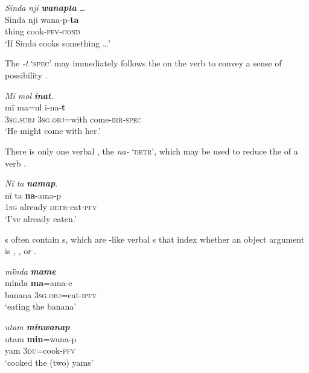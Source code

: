 \ea%
    \label{ex:overview:27}
    \textit{Sinda nji} \textbf{\textit{wanapta}} \textit{…}\\
\gll    Sinda  nji    wana-p-\textbf{ta}\\
    [name]  thing  cook-\textsc{pfv-cond}\\
\glt    ‘If Sinda cooks something …\textsc{’}
\z

The   \textit{{}-t} ‘\textsc{spec’} may immediately follows the   on the verb to convey a sense of  possibility .

\ea%
    \label{ex:overview:28}
    \textit{Mï mol} \textbf{\textit{inat}}.\\
\gll    mï      ma=ul      i-na-\textbf{t}\\
    3\textsc{sg.subj}  3\textsc{sg.obj}=with  come-\textsc{irr-spec}\\
\glt    ‘He might come with her.’
\z

There is only one verbal , the  \textit{na-} ‘\textsc{detr’}, which may be used to reduce the  of a verb .

\ea%
    \label{ex:overview:29}
    \textit{Nï ta} \textbf{\textit{namap}}.\\
\gll    nï    ta      \textbf{na}{}-ama-p\\
    1\textsc{sg}  already    \textsc{detr}{}-eat-\textsc{pfv}\\
\glt    ‘I’ve already eaten.’
\z

 s often contain s, which are -like verbal s that index whether an object argument is  ,  , or  .

\ea%
    \label{ex:overview:30}
    \textit{mïnda} \textbf{\textit{mame}}\\
\gll    mïnda    \textbf{ma}=ama-e\\
    banana    3\textsc{sg.obj}=eat-\textsc{ipfv}\\
\glt    ‘eating the banana’
\z

\ea%
    \label{ex:overview:31}
    \textit{utam} \textbf{\textit{minwanap}}\\
\gll utam  \textbf{min}=wana-p\\
    yam  3\textsc{du}=cook-\textsc{pfv}\\
\glt    ‘cooked the (two) yams’
\z

